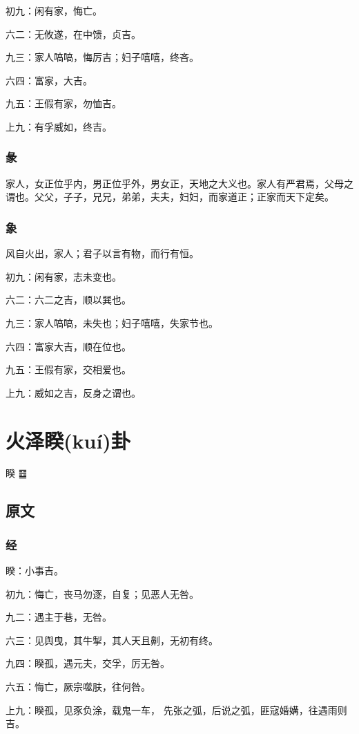 \documentclass[12pt,oneside]{book}
\begin{document}
初九：闲有家，悔亡。

六二：无攸遂，在中馈，贞吉。

九三：家人嗃嗃，悔厉吉；妇子嘻嘻，终吝。

六四：富家，大吉。

九五：王假有家，勿恤吉。

上九：有孚威如，终吉。

\subsection{彖}
家人，女正位乎内，男正位乎外，男女正，天地之大义也。家人有严君焉，父母之谓也。父父，子子，兄兄，弟弟，夫夫，妇妇，而家道正；正家而天下定矣。

\subsection{象}
风自火出，家人；君子以言有物，而行有恒。

初九：闲有家，志未变也。

六二：六二之吉，顺以巽也。

九三：家人嗃嗃，未失也；妇子嘻嘻，失家节也。

六四：富家大吉，顺在位也。

九五：王假有家，交相爱也。

上九：威如之吉，反身之谓也。

\chapter{火泽睽(kuí)卦}
睽 {\Large ䷥}

\section{原文}

\subsection{经}
睽：小事吉。

初九：悔亡，丧马勿逐，自复；见恶人无咎。

九二：遇主于巷，无咎。

六三：见舆曳，其牛掣，其人天且劓，无初有终。

九四：睽孤，遇元夫，交孚，厉无咎。

六五：悔亡，厥宗噬肤，往何咎。

上九：睽孤，见豕负涂，载鬼一车， 先张之弧，后说之弧，匪寇婚媾，往遇雨则吉。
\end{document}
